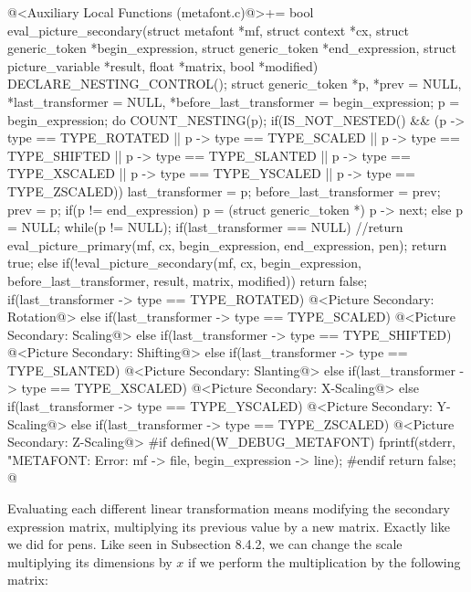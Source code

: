 \iniciocodigo
@<Auxiliary Local Functions (metafont.c)@>+=
bool eval_picture_secondary(struct metafont *mf, struct context *cx,
                            struct generic_token *begin_expression,
                            struct generic_token *end_expression,
                            struct picture_variable *result,
                            float *matrix, bool *modified){
  DECLARE_NESTING_CONTROL();
  struct generic_token *p, *prev = NULL, *last_transformer = NULL,
                       *before_last_transformer = begin_expression;
  p = begin_expression;
  do{
    COUNT_NESTING(p);
    if(IS_NOT_NESTED() && (p -> type == TYPE_ROTATED ||
       p -> type == TYPE_SCALED || p -> type == TYPE_SHIFTED ||
       p -> type == TYPE_SLANTED || p -> type == TYPE_XSCALED ||
       p -> type == TYPE_YSCALED || p -> type == TYPE_ZSCALED)){
      last_transformer = p;
      before_last_transformer = prev;
    }
    prev = p;
    if(p != end_expression)
      p = (struct generic_token *) p -> next;
    else
      p = NULL;
  }while(p != NULL);
  if(last_transformer == NULL)
    //return eval_picture_primary(mf, cx, begin_expression, end_expression, pen);
    return true;
  else{
    if(!eval_picture_secondary(mf, cx, begin_expression,
                               before_last_transformer, result, matrix, modified))
      return false;
    if(last_transformer -> type == TYPE_ROTATED){
      @<Picture Secondary: Rotation@>
    }
    else if(last_transformer -> type == TYPE_SCALED){
      @<Picture Secondary: Scaling@>
    }
    else if(last_transformer -> type == TYPE_SHIFTED){
      @<Picture Secondary: Shifting@>
    }
    else if(last_transformer -> type == TYPE_SLANTED){
      @<Picture Secondary: Slanting@>
    }
    else if(last_transformer -> type == TYPE_XSCALED){
      @<Picture Secondary: X-Scaling@>
    }
    else if(last_transformer -> type == TYPE_YSCALED){
      @<Picture Secondary: Y-Scaling@>
    }
    else if(last_transformer -> type == TYPE_ZSCALED){
      @<Picture Secondary: Z-Scaling@>
    }
#if defined(W_DEBUG_METAFONT)
    fprintf(stderr, "METAFONT: Error: %
            mf -> file, begin_expression -> line);
#endif
    return false;
  }
}
@
\fimcodigo

Evaluating each different linear transformation means modifying the
secondary expression matrix, multiplying its previous value by a new
matrix. Exactly like we did for pens. Like seen in Subsection 8.4.2,
we can change the scale multiplying its dimensions by $x$ if we
perform the multiplication by the following matrix:

